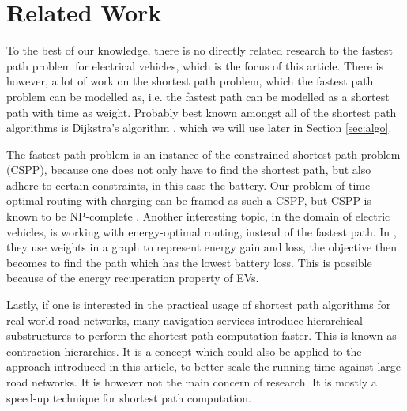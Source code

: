 \section{Related Work}\label{sec:relatedwork}
To the best of our knowledge, there is no directly related research to the fastest path problem for electrical vehicles, which is the focus of this article. There is however, a lot of work on the shortest path problem, which the fastest path problem can be modelled as, i.e. the fastest path can be modelled as a shortest path with time as weight. Probably best known amongst all of the shortest path algorithms is Dijkstra's algorithm \cite{dijkstra1959note}, which we will use later in Section \ref{sec:algo}.

The fastest path problem is an instance of the constrained shortest path problem (CSPP)\cite{joksch1966shortest}, because one does not only have to find the shortest path, but also adhere to certain constraints, in this case the battery. Our problem of time-optimal routing with charging can be framed as such a CSPP, but CSPP is known to be NP-complete \cite{Garey:1979:CIG:578533}. Another interesting topic, in the domain of electric vehicles, is working with energy-optimal routing, instead of the fastest path. In  \cite{artmeier2010shortest}, they use weights in a graph to represent energy gain and loss, the objective then becomes to find the path which has the lowest battery loss. This is possible because of the energy recuperation property of EVs.



Lastly, if one is interested in the practical usage of shortest path algorithms for real-world road networks, many navigation services introduce hierarchical substructures to perform the shortest path computation faster. This is known as contraction hierarchies. It is a concept which could also be applied to the approach introduced in this article, to better scale the running time against large road networks. It is however not the main concern of research. It is mostly a speed-up technique for shortest path computation.